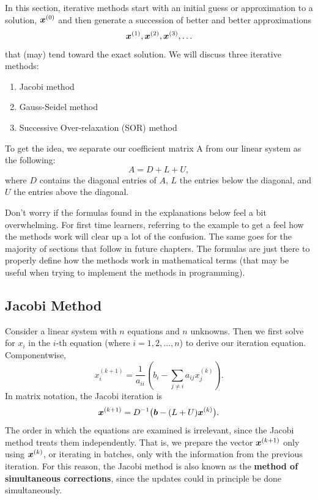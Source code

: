 In this section, iterative methods start with an initial guess or approximation to a solution, $\boldsymbol{x}^{(0)}$ and then generate a succession of better and better approximations
\[
 \boldsymbol{x}^{(1)},\boldsymbol{x}^{(2)},\boldsymbol{x}^{(3)},\ldots
\]
that (may) tend toward the exact solution.
We will discuss three iterative methods:
\begin{enumerate}
\item Jacobi method
\item Gauss-Seidel method
\item Successive Over-relaxation (SOR) method
\end{enumerate}

\noindent
To get the idea, we separate our coefficient matrix A from our linear system as the following:
\[
 A=D+L+U,
\]
where $D$ contains the diagonal entries of $A$, $L$ the entries below the diagonal, and $U$ the entries above the diagonal.

\noindent
Don't worry if the formulas found in the explanations below feel a bit overwhelming. For first time learners, referring to the example to get a feel how the methods work will clear up a lot of the confusion. The same goes for the majority of sections that follow in future chapters. The formulas are just there to properly define how the methods work in mathematical terms (that may be useful when trying to implement the methods in programming).

\subsection{Jacobi Method}
Consider a linear system with $n$ equations and $n$ unknowns. Then we first solve for $x_i$ in the $i$-th equation (where $i=1,2,\dots,n$) to derive our iteration equation.
Componentwise,
\[
 x_i^{(k+1)}
 =\frac{1}{a_{ii}}
 \left(b_i-\sum_{j\ne i}a_{ij}x_j^{(k)}\right).
\]
In matrix notation, the Jacobi iteration is
\[
 \boldsymbol{x}^{(k+1)}
 =D^{-1}\bigl(\boldsymbol{b}-(L+U)\boldsymbol{x}^{(k)}\bigr).
\]
The order in which the equations are examined is irrelevant, since the Jacobi method treats them independently. That is, we prepare the vector $\boldsymbol{x}^{(k+1)}$ only using $\boldsymbol{x}^{(k)}$, or iterating in batches, only with the information from the previous iteration. For this reason, the Jacobi method is also known as the \textbf{method of simultaneous corrections}, since the updates could in principle be done simultaneously.

